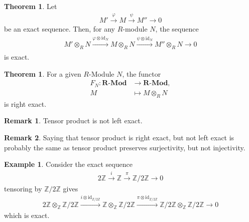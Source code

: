 \documentclass[a4paper]{book}
\theoremstyle{definition}
\newtheorem{example}{Example}[definition]
\newtheorem{theorem}[definition]{Theorem}
\newtheorem*{remark}{Remark}
\begin{document}
\begin{thmbox}
    \begin{theorem}
        Let
        \begin{align*}
            M' \overset{\varphi}{\longrightarrow} M \overset{\psi}{\longrightarrow} M'' \longrightarrow 0
        \end{align*}
        be an exact sequence. Then, for any \(R\)-module \(N\), the sequence
        \begin{align*}
            M' \otimes_R N \xrightarrow[]{\varphi \otimes \text{id}_N} M \otimes_R N \xrightarrow[]{\psi \otimes \text{id}_N} M'' \otimes_R N \longrightarrow 0
        \end{align*}
        is exact.
    \end{theorem}
\end{thmbox}

\begin{thmbox}
    \begin{theorem}
        For a given \(R\)-Module \(N\), the functor
        \begin{align*}
            F_N: \textbf{R-Mod} &\rightarrow \textbf{R-Mod},\\
            M &\mapsto M \otimes_R N
        \end{align*}
        is right exact.
    \end{theorem}
\end{thmbox}

\begin{rembox}
    \begin{remark}
        Tensor product is not left exact.
    \end{remark}
\end{rembox}

\begin{rembox}
    \begin{remark}
        Saying that tensor product is right exact, but not left exact is probably the same as tensor product preserves surjectivity, but not injectivity.
    \end{remark}
\end{rembox}

\begin{exmbox}
    \begin{example}
        Consider the exact sequence
        \begin{align*}
            2 \mathbb{Z} \overset{i}{\longrightarrow} \mathbb{Z} \overset{\pi}{\longrightarrow} \mathbb{Z} / 2\mathbb{Z} \longrightarrow 0
        \end{align*}
        tensoring by \(\mathbb{Z} / 2 \mathbb{Z}\) gives
        \begin{align*}
            2 \mathbb{Z} \otimes_\mathbb{Z} \mathbb{Z} / 2 \mathbb{Z} \xrightarrow{i \otimes \text{id}_{\mathbb{Z} / 2 \mathbb{Z}}} \mathbb{Z} \otimes_\mathbb{Z} \mathbb{Z} / 2 \mathbb{Z} \xrightarrow{\pi \otimes \text{id}_{\mathbb{Z} / 2 \mathbb{Z}}} \mathbb{Z} / 2 \mathbb{Z} \otimes_\mathbb{Z} \mathbb{Z} / 2 \mathbb{Z} \longrightarrow 0
        \end{align*}
        which is exact.
    \end{example}
\end{exmbox}
\end{document}
